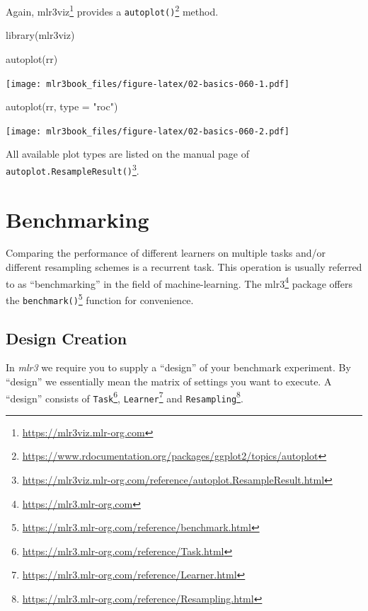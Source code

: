 \documentclass[12pt,]{scrbook}
\newenvironment{Shaded}{}{}
\newcommand{\DataTypeTok}[1]{#1}
\newcommand{\KeywordTok}[1]{\textcolor[rgb]{0.00,0.00,1.00}{#1}}
\newcommand{\NormalTok}[1]{#1}
\newcommand{\StringTok}[1]{\textcolor[rgb]{0.00,0.50,0.50}{#1}}
\renewcommand{\href}[2]{#2\footnote{\url{#1}}}
\begin{document}
Again, \href{https://mlr3viz.mlr-org.com}{mlr3viz} provides a \href{https://www.rdocumentation.org/packages/ggplot2/topics/autoplot}{\texttt{autoplot()}} method.

\begin{Shaded}
\begin{Highlighting}[]
\KeywordTok{library}\NormalTok{(mlr3viz)}

\KeywordTok{autoplot}\NormalTok{(rr)}
\end{Highlighting}
\end{Shaded}

\texttt{[image: mlr3book\_files/figure-latex/02-basics-060-1.pdf]}

\begin{Shaded}
\begin{Highlighting}[]
\KeywordTok{autoplot}\NormalTok{(rr, }\DataTypeTok{type =} \StringTok{"roc"}\NormalTok{)}
\end{Highlighting}
\end{Shaded}

\texttt{[image: mlr3book\_files/figure-latex/02-basics-060-2.pdf]}

All available plot types are listed on the manual page of \href{https://mlr3viz.mlr-org.com/reference/autoplot.ResampleResult.html}{\texttt{autoplot.ResampleResult()}}.

\hypertarget{benchmarking}{%
\section{Benchmarking}\label{benchmarking}}

Comparing the performance of different learners on multiple tasks and/or different resampling schemes is a recurrent task.
This operation is usually referred to as ``benchmarking'' in the field of machine-learning.
The \href{https://mlr3.mlr-org.com}{mlr3} package offers the \href{https://mlr3.mlr-org.com/reference/benchmark.html}{\texttt{benchmark()}} function for convenience.

\hypertarget{bm-design}{%
\subsection{Design Creation}\label{bm-design}}

In \emph{mlr3} we require you to supply a ``design'' of your benchmark experiment.
By ``design'' we essentially mean the matrix of settings you want to execute.
A ``design'' consists of \href{https://mlr3.mlr-org.com/reference/Task.html}{\texttt{Task}}, \href{https://mlr3.mlr-org.com/reference/Learner.html}{\texttt{Learner}} and \href{https://mlr3.mlr-org.com/reference/Resampling.html}{\texttt{Resampling}}.
\end{document}

